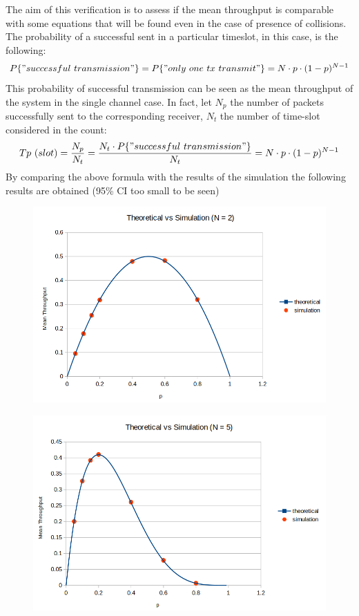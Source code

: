 \noindent The aim of this verification is to assess if the mean throughput is comparable with some equations that will be found even in the case of presence of collisions. \\


\noindent The probability of a successful sent in a particular timeslot, in this case, is the following:
\begin{equation}
	P\{" successful\ transmission"\} = P\{"only\ one\ tx\ transmit"\} = N\cdot p \cdot(1-p)^{N-1}
\end{equation}
This probability of successful transmission can be seen as the mean throughput of the system in the single channel case. In fact, let $N_{p}$ the number of packets successfully sent to the corresponding receiver, $N_{t}$ the number of time-slot considered in the count:
\begin{align*}
Tp\ (slot) = \frac{N_{p}}{N_{t}} = \frac{N_{t}\cdot P\{"successful\ transmission"\}}{N_{t}} = N\cdot p\cdot (1-p)^{N-1}
\end{align*}
By comparing the above formula with the results of the simulation the following results are obtained (95\% CI too small to be seen)
\begin{figure}[H]
	\centering
	\includegraphics[width=\textwidth]{img/SecondVerificationN2.png}
\end{figure}
\begin{figure}[H]
	\centering
	\includegraphics[width=\textwidth]{img/SecondVerificationN5.png}
\end{figure}
